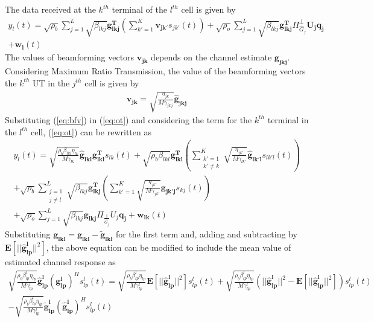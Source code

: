 \documentclass[10pt, a4paper, twoside,fleqn]{article}
\begin{document}
The data received at the $k^{th}$ terminal of the $l^{th}$ cell is given by
\begin{eqnarray}\label{eq:ot}
 	y_{l}(t) = \sqrt{\rho_b}\sum_{j=1}^{L} \sqrt{\beta_{lkj}} \mathbf{g_{lkj}^{T}} \left(\sum_{k'=1}^{K}\mathbf{v_{jk'}}s_{jk'}(t)\right)
 		      + \sqrt{\rho_o}\sum_{j=1}^{L}\sqrt{\beta_{lkj}}\mathbf{g^T_{lkj}} \Pi^{\perp}_{{\widehat{G}_j}} \mathbf{U_jq_{j}} \nonumber \\
 		      + \mathbf{w_{l}}(t)
\end{eqnarray}  
The values of beamforming vectors $\mathbf{v_{jk}}$ depends on the channel estimate $\mathbf{g_{jkj}}$. Considering Maximum Ratio Transmission, the value of the beamforming vectors the $k^{th}$ UT in the $j^{th}$ cell is given by
\begin{eqnarray}\label{eq:bfv}
	\mathbf{v_{jk}} = \sqrt{\frac{\eta_{jk}}{M\gamma_{jkj}}}\mathbf{\hat g_{jkj}}
\end{eqnarray}
Substituting (\ref{eq:bfv}) in (\ref{eq:ot}) and considering the term for the $k^{th}$ terminal in the $l^{th}$ cell, (\ref{eq:ot}) can be rewritten as
\begin{eqnarray}\label{eqn:completeot}
    y_{l}(t) = \sqrt{\frac{\rho_b\beta_{lkl}\eta_{lk}}{M\gamma_{lk}}}\mathbf{\hat g_{lkl}} \mathbf{g_{lkl}^T}s_{lk}(t)
                  + \sqrt{\rho_b\beta_{lkl}} \mathbf{g_{lkl}^T} \left(\sum_{\substack{k'=1 \\ k' \neq k}}^{K} \sqrt{\frac{\eta_{jk'}}{M\gamma_{lk'}}}\mathbf{\hat g_{lk'l}}s_{lk'l} (t)\right) \nonumber \\
		  + \sqrt{\rho_b} \sum_{\substack{j=1 \\ j \neq l}}^{L}\sqrt{\beta_{lkj}} \mathbf{g_{lkj}^T} \left(\sum_{k'=1}^{K} \sqrt{\frac{\eta_{jk'}}{M\gamma_{jk'}}}\mathbf{g_{jk'j}}s_{kj} (t)\right) \nonumber \\
		  + \sqrt{\rho_o}\sum_{j=1}^{L}\sqrt{\beta_{lkj}}\mathbf{g_{lkj}} \Pi_{\frac{1}{\hat G_j}} U_j \mathbf{q_{j}}
    	  	  + \mathbf{w_{lk}}(t)
\end{eqnarray}
Substituting $\mathbf{g_{lkl}} = \mathbf{\hat g_{lkl}} - {\mathbf{\widetilde{g}_{lkl}}}$ for the first term and, adding and subtracting by $\mathbf{E}[||\mathbf{\hat g_{lp}^{l}}||^2]$, the above equation can be modified to include the mean value of estimated channel response as
\begin{eqnarray} \label{eqn:otsig}
	\sqrt{\frac{\rho_b\beta_{lp}^{l}\eta_{lp}}{M\gamma_{lp}^{l}}}\mathbf{\hat g_{lp}^{l}} (\mathbf{g_{lp}^{l}})^H  s_{lp}^{l}(t)
	           =  \sqrt{\frac{\rho_b\beta_{lp}^{l}\eta_{lp}}{M\gamma_{lp}^{l}}}\mathbf{E}[||\mathbf{\hat g_{lp}^{l}}||^2]s_{lp}^{l}(t)
	           +  \sqrt{\frac{\rho_b\beta_{lp}^{l}\eta_{lp}}{M\gamma_{lp}^{l}}}\left(||\mathbf{\hat g_{lp}^{l}}||^2 - \mathbf{E}[||\mathbf{\hat g_{lp}^{l}}||^2]\right)s_{lp}^{l}(t) \nonumber \\
	           -   \sqrt{\frac{\rho_b\beta_{lp}^{l}\eta_{lp}}{M\gamma_{lp}^{l}}}\mathbf{\widetilde{g}_{lp}^{l}} (\mathbf{\hat g_{lp}^{l}})^H  s_{lp}^{l}(t)
\end{eqnarray}
\end{document}
